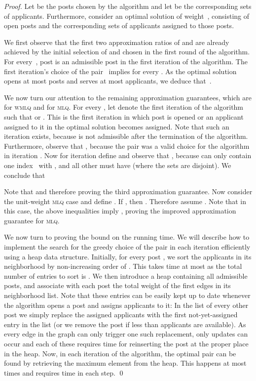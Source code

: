 \documentclass{llncs}
\begin{document}
\begin{proof}
Let  be the posts chosen by the algorithm and let  be the corresponding sets of applicants. Furthermore, consider an optimal solution of weight~, consisting of open posts  and the corresponding sets of applicants  assigned to those posts.

We first observe that the first two approximation ratios of  and  are already achieved by the initial selection of  and  chosen in the first round of the algorithm. For every~\mbox{}, post  is an admissible post in the first iteration of the algorithm. The first iteration's choice of the pair~ implies  for every . As the optimal solution opens at most  posts and serves at most  applicants, we deduce that~.

We now turn our attention to the remaining approximation guarantees, which are  for \textsc{wmlq} and  for \textsc{mlq}. For every , let  denote the first iteration of the algorithm such that  or . This is the first iteration in which post  is opened or an applicant assigned to it in the optimal solution becomes assigned. Note that such an iteration exists, because  is not admissible after the termination of the algorithm. Furthermore, observe that , because the pair  was a valid choice for the algorithm in iteration . Now for iteration  define  and observe that , because  can only contain one index~ with , and all other  must have  (where the sets  are disjoint). We conclude that


Note that  and therefore  proving the third approximation guarantee. Now consider the unit-weight \textsc{mlq} case and define . If , then . Therefore assume .
Note that in this case, the above inequalities imply , proving the improved approximation guarantee for \textsc{mlq}.

We now turn to proving the bound on the running time. We will describe how to implement the search for the greedy choice of the pair  in each iteration efficiently using a heap data structure. Initially, for every post , we sort the applicants in its neighborhood by non-increasing order of . This takes time at most  as the total number of entries to sort is . We then introduce a heap containing all admissible posts, and associate with each post  the total weight of the first  edges in its neighborhood list. 
Note that these entries can be easily kept up to date whenever the algorithm opens a post and assigns applicants to it: In the list of every other post  we simply replace the assigned applicants with the first not-yet-assigned entry in the list (or we remove the post if less than  applicants are available). As every edge in the graph can only trigger one such replacement, only  updates can occur and each of these requires  time for reinserting the post at the proper place in the heap. Now, in each iteration of the algorithm, the optimal pair  can be found by retrieving the maximum element from the heap. This happens at most  times and requires  time in each step. \qed
\end{proof}
\end{document}
